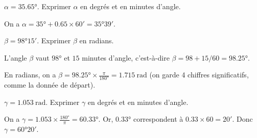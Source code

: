 	
	
	\begin{enonce}
		$\alpha=\ang{35.65}$. Exprimer $\alpha$ en degrés et en minutes d'angle.
	\end{enonce}
	
	
	\begin{corrige}
		On a $\alpha=\ang{35}+\num{0.65}\times\ang{;60;}=\ang{35;39;}$.
	\end{corrige}
	
	
	
	
	\begin{enonce}
		$\beta=\ang{98;15;}$. Exprimer $\beta$ en radians.
	\end{enonce}
	
	
	\begin{corrige}
		L'angle $\beta$ vaut $\ang{98}$ et $\num{15}$ minutes d'angle, c'est-à-dire $\beta=98+15/60=\ang{98.25}$. 
		
		En radians, on a $\beta=\ang{98.25}\times \frac{\pi}{\ang{180}}=\SI{1,715}{\radian}$ (on garde 4 chiffres significatifs, comme la donnée de départ).
	\end{corrige}
	
	
	
	
	
	
	
	\begin{enonce}
		$\gamma=\SI{1.053}{\radian}$. Exprimer $\gamma$ en degrés et en minutes d'angle.
	\end{enonce}
	
	
	\begin{corrige}
	On a $\gamma=\num{1.053}\times \frac{\ang{180}}{\pi}=\ang{60.33}$. Or, $\ang{0.33}$ correspondent à $\num{0.33}\times60=\ang{;20;}$. Donc $\gamma=\ang{60;20;}$.
	\end{corrige}
	
	\finEntrainement
	
